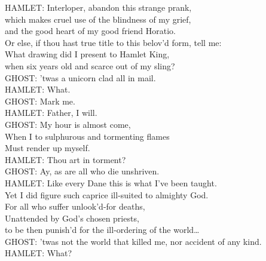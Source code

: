 \begin{playdialog}
HAMLET: Interloper, abandon this strange prank,\\
which makes cruel use of the blindness of my grief,\\
and the good heart of my good friend Horatio.\\
Or else, if thou hast true title to this belov’d form, tell me:\\ What drawing did I present to Hamlet King,\\ when six years old and scarce out of my sling?\\

GHOST: ’twas a unicorn clad all in mail.\\

HAMLET: What.\\

GHOST: Mark me.\\

HAMLET: Father, I will.\\

GHOST: My hour is almost come,\\
When I to sulphurous and tormenting flames\\
Must render up myself.\\

HAMLET: Thou art in torment?\\

GHOST: Ay, as are all who die unshriven.\\

HAMLET: Like every Dane this is what I’ve been taught.\\
Yet I did figure such caprice ill-suited to almighty God.\\
For all who suffer unlook’d-for deaths,\\
Unattended by God’s chosen priests,\\
to be then punish’d for the ill-ordering of the world…\\

GHOST: ’twas not the world that killed me, nor accident of any kind.\\

HAMLET: What?\\


\end{playdialog}

